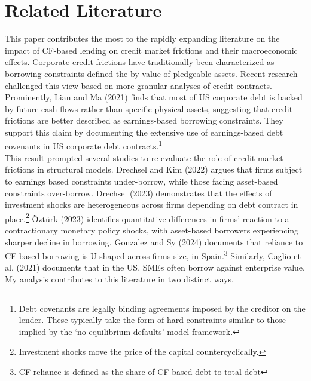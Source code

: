 \documentclass[12pt]{article}
\begin{document}
\section{Related Literature \label{sec:literature}} 
This paper contributes the most to the rapidly expanding literature on the impact of CF-based lending on credit market frictions and their macroeconomic effects. Corporate credit frictions have traditionally been characterized as borrowing constraints defined the by value of pledgeable assets. Recent research challenged this view based on more granular analyses of credit contracts. Prominently, Lian and Ma (2021) finds that most of US corporate debt is backed by future cash flows rather than specific physical assets, suggesting that credit frictions are better described as earnings-based borrowing constraints. They support this claim by documenting the extensive use of earnings-based debt covenants in US corporate debt contracts.\footnote{Debt covenants are legally binding agreements imposed by the creditor on the lender. These typically take the form of hard constraints similar to those implied by the `no equilibrium defaults' model framework.}   \vspace{3mm} \\
This result prompted several studies to re-evaluate the role of credit market frictions in structural models. Drechsel and Kim (2022) argues that firms subject to earnings based constraints under-borrow, while those facing asset-based constraints over-borrow. Drechsel (2023) demonstrates that the effects of investment shocks are heterogeneous across firms depending on debt contract in place.\footnote{Investment shocks move the price of the capital countercyclically.} Öztürk (2023) identifies quantitative differences in firms' reaction to a contractionary monetary policy shocks, with asset-based borrowers experiencing sharper decline in borrowing. Gonzalez and Sy (2024) documents that reliance to CF-based borrowing is U-shaped across firms size, in Spain.\footnote{CF-reliance is defined as the share of CF-based debt to total debt} Similarly, Caglio et al. (2021) documents that in the US, SMEs often borrow against enterprise value. My analysis contributes to this literature in two distinct ways.  \vspace{3mm} \\
\end{document}
